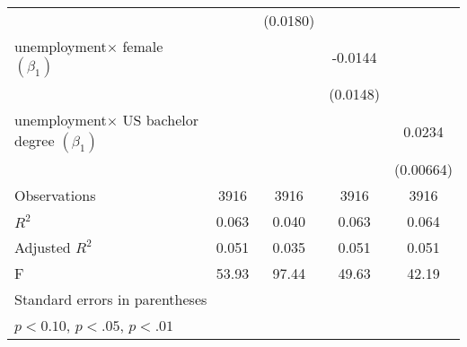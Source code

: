 \begin{table}[ht]
{\begin{tabular}{l*{4}{c}}
                    &                     &    (0.0180)         &                     &                     \\
[1em]
unemployment$\times$ female $\left( \beta_1 \right)$ &                     &                     &     -0.0144         &                     \\
                    &                     &                     &    (0.0148)         &                     \\
[1em]
unemployment$\times$ US bachelor degree $\left( \beta_1 \right)$ &                     &                     &                     &      0.0234\sym{***}\\
                    &                     &                     &                     &   (0.00664)         \\
\hline
Observations        &        3916         &        3916         &        3916         &        3916         \\
\(R^{2}\)           &       0.063         &       0.040         &       0.063         &       0.064         \\
Adjusted \(R^{2}\)  &       0.051         &       0.035         &       0.051         &       0.051         \\
F                   &       53.93         &       97.44         &       49.63         &       42.19         \\
\hline\hline
\multicolumn{5}{l}{\footnotesize Standard errors in parentheses}\\
\multicolumn{5}{l}{\footnotesize \sym{*} \(p<0.10\), \sym{**} \(p<.05\), \sym{***} \(p<.01\)}\\
\end{tabular}%
}
\end{table}
